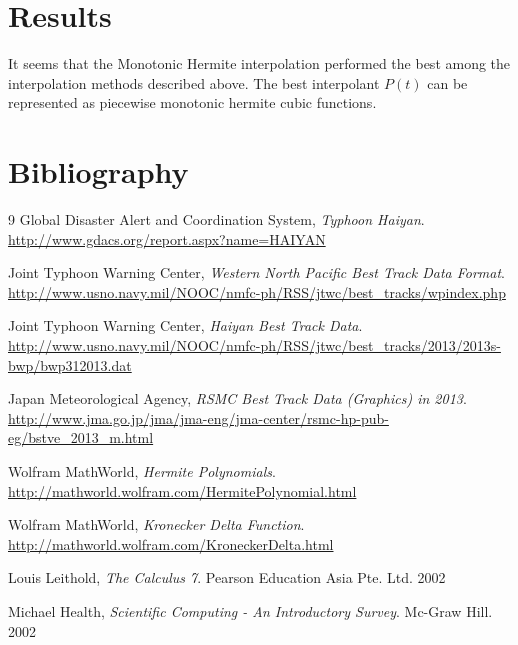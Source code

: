 \documentclass[a4paper, 11pt]{article}
\begin{document}
\section{Results}
It seems that the Monotonic Hermite interpolation performed the best among the interpolation methods described above. The best interpolant $P(t)$ can be represented as piecewise monotonic hermite cubic functions.

\section{Bibliography}
\begin{thebibliography}{9}
	Global Disaster Alert and Coordination System, \emph{Typhoon Haiyan}. \url{http://www.gdacs.org/report.aspx?name=HAIYAN}
	
	Joint Typhoon Warning Center, \emph{Western North Pacific Best Track Data Format}. \url{http://www.usno.navy.mil/NOOC/nmfc-ph/RSS/jtwc/best_tracks/wpindex.php}
	
	Joint Typhoon Warning Center, \emph{Haiyan Best Track Data}. \url{http://www.usno.navy.mil/NOOC/nmfc-ph/RSS/jtwc/best_tracks/2013/2013s-bwp/bwp312013.dat}
	
	Japan Meteorological Agency, \emph{RSMC Best Track Data (Graphics) in 2013}. \url{http://www.jma.go.jp/jma/jma-eng/jma-center/rsmc-hp-pub-eg/bstve_2013_m.html}
	
	Wolfram MathWorld, \emph{Hermite Polynomials}.
	\url{http://mathworld.wolfram.com/HermitePolynomial.html}
	
	Wolfram MathWorld, \emph{Kronecker Delta Function}.
	\url{http://mathworld.wolfram.com/KroneckerDelta.html}
	
	Louis Leithold, \emph{The Calculus 7}. Pearson Education Asia Pte. Ltd. 2002
	
	Michael Health, \emph{Scientific Computing - An Introductory Survey}. Mc-Graw Hill. 2002
\end{thebibliography}
\end{document}
